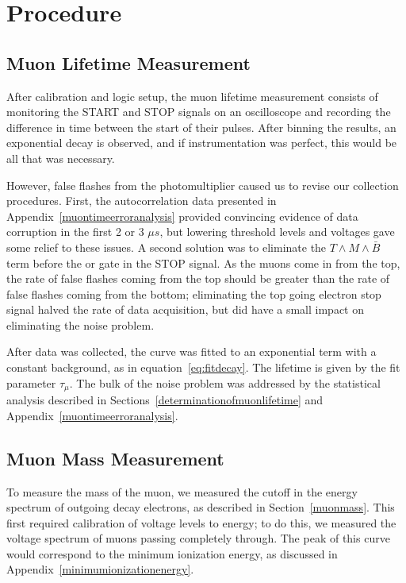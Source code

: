 \section{Procedure}\label{procedure}

\subsection{Muon Lifetime Measurement}
\label{muonlifetimemeasurement}

After calibration and logic setup, the muon lifetime measurement consists of monitoring the START and STOP signals on an oscilloscope and recording the difference in time between the start of their pulses. After binning the results, an exponential decay is observed, and if instrumentation was perfect, this would be all that was necessary.

However, false flashes from the photomultiplier caused us to revise our collection procedures. First, the autocorrelation data presented in Appendix~\ref{muontimeerroranalysis} provided convincing evidence of data corruption in the first 2 or 3 $\mu s$, but lowering threshold levels and voltages gave some relief to these issues. A second solution was to eliminate the $T \wedge M \wedge \bar{B}$ term before the or gate in the STOP signal. As the muons come in from the top, the rate of false flashes coming from the top should be greater than the rate of false flashes coming from the bottom; eliminating the top going electron stop signal halved the rate of data acquisition, but did have a small impact on eliminating the noise problem. 

After data was collected, the curve was fitted to an exponential term with a constant background, as in equation~\eqref{eq:fitdecay}. The lifetime is given by the fit parameter $\tau_{\mu}$. The bulk of the noise problem was addressed by the statistical analysis described in Sections~\ref{determinationofmuonlifetime} and Appendix~\ref{muontimeerroranalysis}.

\subsection{Muon Mass Measurement}
\label{muonmassmeasurement}

To measure the mass of the muon, we measured the cutoff in the energy spectrum of outgoing decay electrons, as described in Section~\ref{muonmass}. This first required calibration of voltage levels to energy; to do this, we measured the voltage spectrum of muons passing completely through. The peak of this curve would correspond to the minimum ionization energy, as discussed in Appendix~\ref{minimumionizationenergy}. 

